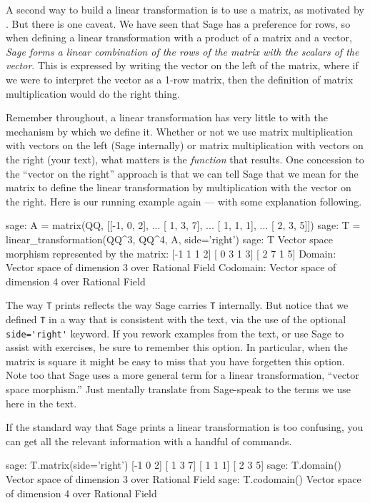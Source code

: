 A second way to build a linear transformation is to use a matrix, as motivated by .  But there is one caveat.  We have seen that Sage has a preference for rows, so when defining a linear transformation with a product of a matrix and a vector, \emph{Sage forms a linear combination of the rows of the matrix with the scalars of the vector}.  This is expressed by writing the vector on the left of the matrix, where if we were to interpret the vector as a 1-row matrix, then the definition of matrix multiplication would do the right thing.\par
%
Remember throughout, a linear transformation has very little to with the mechanism by which we define it.  Whether or not we use matrix multiplication with vectors on the left (Sage internally) or matrix multiplication with vectors on the right (your text), what matters is the \emph{function} that results.  One concession to the ``vector on the right'' approach is that we can tell Sage that we mean for the matrix to define the linear transformation by multiplication with the vector on the right.  Here is our running example again --- with some explanation following.
%
\begin{sageexample}
sage: A = matrix(QQ, [[-1, 0, 2],
...                   [ 1, 3, 7],
...                   [ 1, 1, 1],
...                   [ 2, 3, 5]])
sage: T = linear_transformation(QQ^3, QQ^4, A, side='right')
sage: T
Vector space morphism represented by the matrix:
[-1  1  1  2]
[ 0  3  1  3]
[ 2  7  1  5]
Domain: Vector space of dimension 3 over Rational Field
Codomain: Vector space of dimension 4 over Rational Field
\end{sageexample}
%
The way \verb?T? prints reflects the way Sage carries \verb?T? internally.  But notice that we defined \verb?T? in a way that is consistent with the text, via the use of the optional \verb?side='right'? keyword.  If you rework examples from the text, or use Sage to assist with exercises, be sure to remember this option.  In particular, when the matrix is square it might be easy to miss that you have forgetten this option.  Note too that Sage uses a more general term for a linear transformation, ``vector space morphism.''  Just mentally translate from Sage-speak to the terms we use here in the text.\par
%
If the standard way that Sage prints a linear transformation is too confusing, you can get all the relevant information with a handful of commands.
%
\begin{sageexample}
sage: T.matrix(side='right')
[-1  0  2]
[ 1  3  7]
[ 1  1  1]
[ 2  3  5]
sage: T.domain()
Vector space of dimension 3 over Rational Field
sage: T.codomain()
Vector space of dimension 4 over Rational Field
\end{sageexample}
